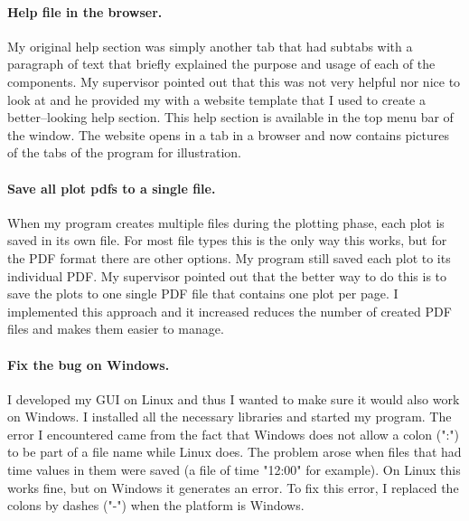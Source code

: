 \documentclass[../00_main.tex]{subfiles}
\begin{document}
\paragraph{Help file in the browser.} My original help section was simply
another tab that had subtabs with a paragraph of text that briefly explained
the purpose and usage of each of the components. My supervisor pointed out that
this was not very helpful nor nice to look at and he provided my with a website
template that I used to create a better--looking help section. This help
section is available in the top menu bar of the window. The website opens in
a tab in a browser and now contains pictures of the tabs of the program for
illustration.

\paragraph{Save all plot pdfs to a single file.} When my program creates
multiple files during the plotting phase, each plot is saved in its own file.
For most file types this is the only way this works, but for the PDF format
there are other options. My program still saved each plot to its individual
PDF. My supervisor pointed out that the better way to do this is to save the
plots to one single PDF file that contains one plot per page. I implemented
this approach and it increased reduces the number of created PDF files and
makes them easier to manage.

\paragraph{Fix the bug on Windows.} I developed my GUI on Linux and thus
I wanted to make sure it would also work on Windows. I installed all the
necessary libraries and started my program. The error I encountered came from
the fact that Windows does not allow a colon (":") to be part of a file name
while Linux does. The problem arose when files that had time values in them
were saved (a file of time "12:00" for example). On Linux this works fine, but
on Windows it generates an error. To fix this error, I replaced the colons by
dashes ("-") when the platform is Windows.
\end{document}
